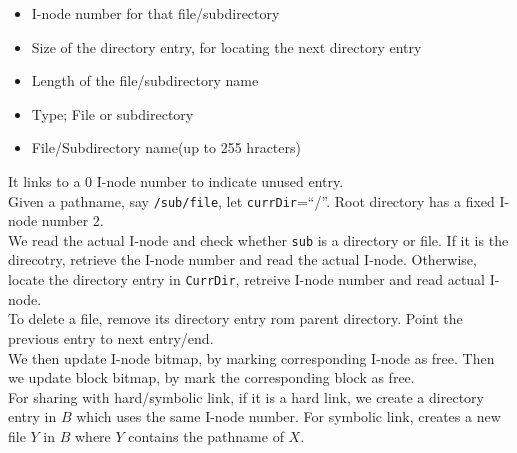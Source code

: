 \documentclass[12pt]{article}
\theoremstyle{definition}
\begin{document}
\begin{itemize}
  \item I-node number for that file/subdirectory
  \item Size of the directory entry, for locating the next directory entry
  \item Length of the file/subdirectory name
  \item Type; File or subdirectory
  \item File/Subdirectory name(up to 255 hracters)
\end{itemize}
It links to a $0$ I-node number to indicate unused entry.\\
Given a pathname, say \texttt{/sub/file}, let \texttt{currDir}=``/''. Root directory has a fixed I-node number $2$.\\
We read the actual I-node and check whether \texttt{sub} is a directory or file. If it is the direcotry, retrieve the I-node number and read the actual I-node. Otherwise, locate the directory entry in \texttt{CurrDir}, retreive I-node number and read actual I-node.\\

To delete a file, remove its directory entry rom parent directory. Point the previous entry to next entry/end.\\
We then update I-node bitmap, by marking corresponding I-node as free. Then we update block bitmap, by mark the corresponding block as free.\\

For sharing with hard/symbolic link, if it is a hard link, we create a directory entry in $B$ which uses the same I-node number. For symbolic link, creates a new file $Y$ in $B$ where $Y$ contains the pathname of $X$.
\end{document}
